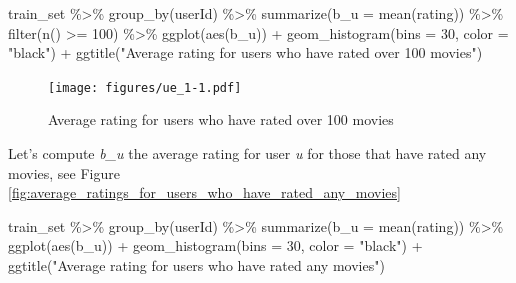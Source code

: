 \documentclass[
]{article}
\newenvironment{Shaded}{}{}
\newcommand{\AttributeTok}[1]{\textcolor[rgb]{0.49,0.56,0.16}{#1}}
\newcommand{\DecValTok}[1]{\textcolor[rgb]{0.25,0.63,0.44}{#1}}
\newcommand{\FunctionTok}[1]{\textcolor[rgb]{0.02,0.16,0.49}{#1}}
\newcommand{\NormalTok}[1]{#1}
\newcommand{\SpecialCharTok}[1]{\textcolor[rgb]{0.25,0.44,0.63}{#1}}
\newcommand{\StringTok}[1]{\textcolor[rgb]{0.25,0.44,0.63}{#1}}
\begin{document}
\begin{Shaded}
\begin{Highlighting}[]
\NormalTok{train\_set }\SpecialCharTok{\%\textgreater{}\%} \FunctionTok{group\_by}\NormalTok{(userId) }\SpecialCharTok{\%\textgreater{}\%} \FunctionTok{summarize}\NormalTok{(}\AttributeTok{b\_u =} \FunctionTok{mean}\NormalTok{(rating)) }\SpecialCharTok{\%\textgreater{}\%} 
    \FunctionTok{filter}\NormalTok{(}\FunctionTok{n}\NormalTok{() }\SpecialCharTok{\textgreater{}=} \DecValTok{100}\NormalTok{) }\SpecialCharTok{\%\textgreater{}\%} \FunctionTok{ggplot}\NormalTok{(}\FunctionTok{aes}\NormalTok{(b\_u)) }\SpecialCharTok{+} \FunctionTok{geom\_histogram}\NormalTok{(}\AttributeTok{bins =} \DecValTok{30}\NormalTok{, }
    \AttributeTok{color =} \StringTok{"black"}\NormalTok{) }\SpecialCharTok{+} \FunctionTok{ggtitle}\NormalTok{(}\StringTok{"Average rating for users who have rated over 100 movies"}\NormalTok{)}
\end{Highlighting}
\end{Shaded}

\begin{figure}
\centering
\texttt{[image: figures/ue\_1-1.pdf]}
\caption{Average rating for users who have rated over 100
movies\label{fig:average_ratings_for_users_who_have_rated_over_100_movies}}
\end{figure}

\newpage

Let's compute \emph{b\_u} the average rating for user \emph{u} for those
that have rated any movies, see Figure
\ref{fig:average_ratings_for_users_who_have_rated_any_movies}

\begin{Shaded}
\begin{Highlighting}[]
\NormalTok{train\_set }\SpecialCharTok{\%\textgreater{}\%} \FunctionTok{group\_by}\NormalTok{(userId) }\SpecialCharTok{\%\textgreater{}\%} \FunctionTok{summarize}\NormalTok{(}\AttributeTok{b\_u =} \FunctionTok{mean}\NormalTok{(rating)) }\SpecialCharTok{\%\textgreater{}\%} 
    \FunctionTok{ggplot}\NormalTok{(}\FunctionTok{aes}\NormalTok{(b\_u)) }\SpecialCharTok{+} \FunctionTok{geom\_histogram}\NormalTok{(}\AttributeTok{bins =} \DecValTok{30}\NormalTok{, }\AttributeTok{color =} \StringTok{"black"}\NormalTok{) }\SpecialCharTok{+} 
    \FunctionTok{ggtitle}\NormalTok{(}\StringTok{"Average rating for users who have rated any movies"}\NormalTok{)}
\end{Highlighting}
\end{Shaded}
\end{document}

